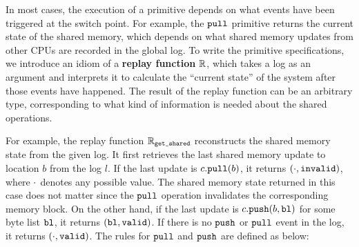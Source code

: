 In most cases, the execution of a primitive depends on what events have
been triggered at the switch point. 
For example, the ${\texttt{pull}}$ primitive returns the
current state of the shared memory, which depends on what shared
memory updates from other CPUs are recorded in the global log.
To write the primitive specifications, we introduce an idiom of a
\textbf{replay function} $\mathbb{R}$, which takes a
log as an argument and interprets it to calculate the ``current
state'' of the system after those events have happened. The
result of the replay function can be an arbitrary type, corresponding
to what kind of information is needed about the shared operations.

For example, the replay function $\mathbb{R}_{{\texttt{get\_shared}}}$
reconstructs the shared memory state from the given log.
It first retrieves the last shared memory
update to location $b$ from the log $l$. If the last update is
$c.{\texttt{pull}}(b)$, it returns $(\cdot, {\texttt{invalid}})$, where $\cdot$ denotes
any possible value. The shared memory state returned in this case
does not matter since the ${\texttt{pull}}$ operation invalidates the corresponding
memory block. On the other hand, if the last update
is $c.{\texttt{push}}(b,{\texttt{bl}})$ for some byte list ${\texttt{bl}}$,
it returns $({\texttt{bl}}, {\texttt{valid}})$. 
If there is no ${\texttt{push}}$ or ${\texttt{pull}}$ event in the log, it returns
$(\cdot, {\texttt{valid}})$. 
The rules for ${\texttt{pull}}$ and ${\texttt{push}}$ are defined as below:
\begin{small}
\vspace{-5pt}
\end{small}%


